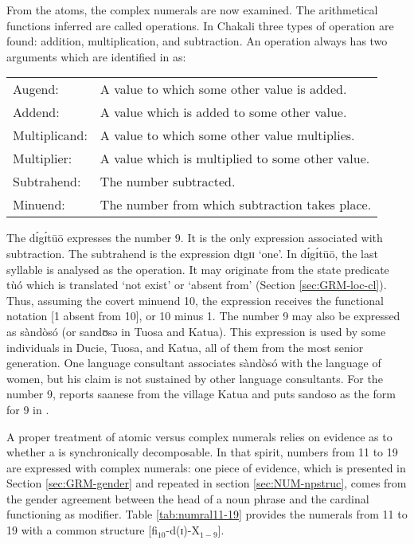 \begin{exe}
\begin{exe}
\begin{exe}
\begin{exe}
\begin{exe}
\begin{exe}
\begin{exe}
\begin{exe}
\begin{exe}
\begin{exe}
From the atoms,  the complex numerals are now examined. The arithmetical functions inferred are called operations. In Chakali three types of operation are found: addition, multiplication, and subtraction. An operation always has two arguments which are identified in \citet{Gree78b} as: 

\vspace{2ex}

\begin{tabular}{ll}
{ Augend:} & A value to which some other value is
added.\\
{ Addend:} & A value which is added to some other
value.\\
{ Multiplicand:} & A value to which some other
value multiplies.\\

{ Multiplier:} & A value which is multiplied to
some other value.\\

{ Subtrahend:}  & The number subtracted.\\
{ Minuend:}  & The number from which subtraction takes
place.\\
\end{tabular}

\vspace{2ex}

The  {\sls   dɪ́gɪ́tūō} expresses the number 9. It is the only expression associated with subtraction.  The subtrahend is the expression {\sls dɪgɪɪ} `one'.   In {\sls   dɪ́gɪ́tūō},  the last syllable   is analysed as the operation. It may originate from the state predicate  {\sls tùó} which is translated `not exist'  or `absent from' (Section \ref{sec:GRM-loc-cl}). Thus, assuming the covert minuend 10, the  expression receives the functional notation [1 {\sc absent from} 10], or 10 minus 1.  The number 9 may also be expressed as {\sls sàndòsó}  (or {\sls sandʊsə} in Tuosa and Katua). This expression is used by some individuals in Ducie, Tuosa, and Katua, all of them from the most senior generation.  One language consultant associates  {\sls sàndòsó} with the language of women, but his claim is not sustained by other language consultants. For the number 9, \citet[33]{Good54} reports {\sls saanese} from the village Katua and  \citet[117]{Ratt32b} puts {\sls sandoso} as the form for 9 in . 

A proper  treatment of  atomic versus  complex numerals   relies  on evidence as to whether a  is synchronically  decomposable. In  that spirit,  numbers from 11 to 19 are expressed with complex numerals:  one piece of evidence, which is presented in Section \ref{sec:GRM-gender} and repeated in section \ref{sec:NUM-npstruc}, comes from the gender agreement between the head of a noun phrase and the cardinal  functioning as modifier.  Table \ref{tab:numral11-19} provides the  numerals from 11 to 19 with a common structure [fi$_{10}$-d(ɪ)-X$_{1-9}$]. 



\end{exe}
\end{exe}
\end{exe}
\end{exe}
\end{exe}
\end{exe}
\end{exe}
\end{exe}
\end{exe}
\end{exe}
